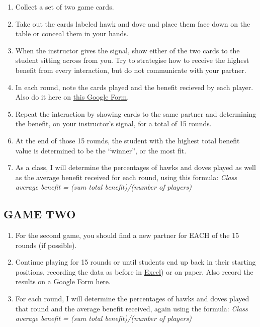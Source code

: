 \documentclass[
  a4paper]{book}
\begin{document}
\begin{enumerate}
\def\labelenumi{\arabic{enumi}.}
\item
  Collect a set of two game cards.
\item
  Take out the cards labeled hawk and dove and place them face down on the table or conceal them in your hands.
\item
  When the instructor gives the signal, show either of the two cards to the student sitting across from you. Try to strategise how to receive the highest benefit from every interaction, but do not communicate with your partner.
\item
  In each round, note the cards played and the benefit recieved by each player. Also do it here on \href{https://forms.gle/3fjBGF7xVAYRQ5hXA}{this Google Form}.
\item
  Repeat the interaction by showing cards to the same partner and determining the benefit, on your instructor's signal, for a total of 15 rounds.
\item
  At the end of those 15 rounds, the student with the highest total benefit value is determined to be the ``winner'', or the most fit.
\item
  As a class, I will determine the percentages of hawks and doves played as well as the average benefit received for each round, using this formula: \emph{Class average benefit = (sum total benefit)/(number of players)}
\end{enumerate}

\subsection{GAME TWO}\label{game-two}

\begin{enumerate}
\def\labelenumi{\arabic{enumi}.}
\item
  For the second game, you should find a new partner for EACH of the 15 rounds (if possible).
\item
  Continue playing for 15 rounds or until students end up back in their starting positions, recording the data as before in \href{https://www.dropbox.com/s/3tjkck3kmpek6xc/Table_3_Group_behavior.xlsx?dl=1}{Excel}) or on paper. Also record the results on a Google Form \href{https://forms.gle/F9YhYcTWRvoF4djt7}{here}.
\item
  For each round, I will determine the percentages of hawks and doves played that round and the average benefit received, again using the formula: \emph{Class average benefit = (sum total benefit)/(number of players)}
\end{enumerate}
\end{document}
